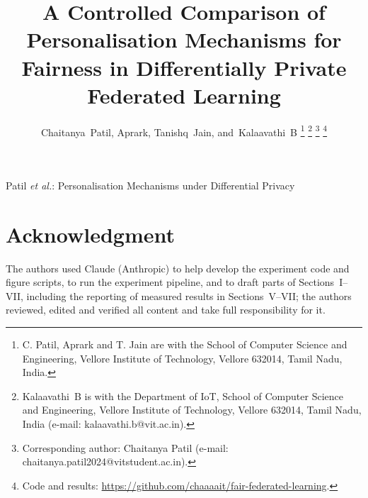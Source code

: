 \documentclass[journal]{IEEEtran}
\begin{document}
\title{A Controlled Comparison of Personalisation Mechanisms for Fairness in Differentially Private Federated Learning}

\author{Chaitanya~Patil, Aprark, Tanishq~Jain, and~Kalaavathi~B%
\thanks{C. Patil, Aprark and T. Jain are with the School of Computer Science and Engineering, Vellore Institute of Technology, Vellore 632014, Tamil Nadu, India.}%
\thanks{Kalaavathi~B is with the Department of IoT, School of Computer Science and Engineering, Vellore Institute of Technology, Vellore 632014, Tamil Nadu, India (e-mail: kalaavathi.b@vit.ac.in).}%
\thanks{Corresponding author: Chaitanya Patil (e-mail: chaitanya.patil2024@vitstudent.ac.in).}%
\thanks{Code and results: \url{https://github.com/chaaaait/fair-federated-learning}.}}

%
{Patil \MakeLowercase{\textit{et al.}}: Personalisation Mechanisms under Differential Privacy}

\maketitle











\section*{Acknowledgment}
The authors used Claude (Anthropic) to help develop the experiment code and figure scripts, to run the
experiment pipeline, and to draft parts of Sections~I--VII, including the reporting of measured results in
Sections~V--VII; the authors reviewed, edited and verified all content and take full responsibility for it.



\end{document}

